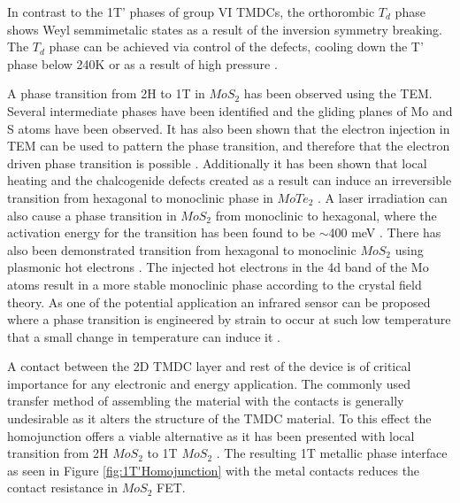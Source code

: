 In contrast to the 1T' phases of group VI TMDCs, the orthorombic $T_d$ phase shows Weyl semmimetalic states as a result of the inversion symmetry breaking. The $T_d$ phase can be achieved via control of the defects, cooling down the T' phase below 240K or as a result of high pressure \cite{Qi2016}. 

A phase transition from 2H to 1T in $MoS_2$ has been observed using the TEM. Several intermediate phases have been identified and the gliding planes of Mo and S atoms have been observed. It has also been shown that the electron injection in TEM can be used to pattern the phase transition, and therefore that the electron driven phase transition is possible \cite{Lin2014}. Additionally it has been shown that local heating and the chalcogenide defects created as a result can induce an irreversible transition from hexagonal to monoclinic phase in $MoTe_2$ \cite{Cho2015}. A laser irradiation can also cause a phase transition in $MoS_2$ from monoclinic to hexagonal, where the activation energy for the transition has been found to be $\sim$400 meV \cite{Guo2015}. There has also been demonstrated transition from hexagonal to monoclinic $MoS_2$ using plasmonic hot electrons \cite{Kang2014}. The injected hot electrons in the 4d band of the Mo atoms result in a more stable monoclinic phase according to the crystal field theory. As one of the potential application an infrared sensor can be proposed where a phase transition is engineered by strain to occur at such low temperature that a small change in temperature can induce it \cite{Song2015}.

A contact between the 2D TMDC layer and rest of the device is of critical importance for any electronic and energy application. The commonly used transfer method of assembling the material with the contacts is generally undesirable as it alters the structure of the TMDC material. To this effect the homojunction offers a viable alternative as it has been presented with local transition from 2H $MoS_2$ to 1T $MoS_2$ \cite{Kappera2014}. The resulting 1T metallic phase interface as seen in Figure \ref{fig:1T'Homojunction} with the metal contacts reduces the contact resistance in $MoS_2$ FET.

